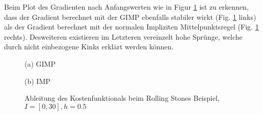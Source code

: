 Beim Plot des Gradienten nach Anfangswerten wie in Figur \ref{fig:rollingGrad} ist zu erkennen, dass der Gradient berechnet mit der GIMP ebenfalls stabiler wirkt (Fig. \ref{fig:rollingGrad} links) als der Gradient berechnet mit der normalen Impliziten Mittelpunktsregel (Fig. \ref{fig:rollingGrad} rechts). Desweiteren existieren im Letzteren vereinzelt hohe Sprünge, welche durch nicht einbezogene Kinks erklärt werden können. 
\begin{figure}[H]
\footnotesize 
\centering
\begin{minipage}[b]{0.49\linewidth}

\end{minipage}
\begin{minipage}[b]{0.49\linewidth}

\end{minipage}
\begin{minipage}[b]{0.49\linewidth}

\caption*{(a) GIMP}
\end{minipage}
\begin{minipage}[b]{0.49\linewidth}

\caption*{(b) IMP}
\end{minipage}
\caption{Ableitung des Kostenfunktionals beim Rolling Stones Beispiel, $I = [0,30],h=0.5$}
\label{fig:rollingGrad}
\end{figure}


